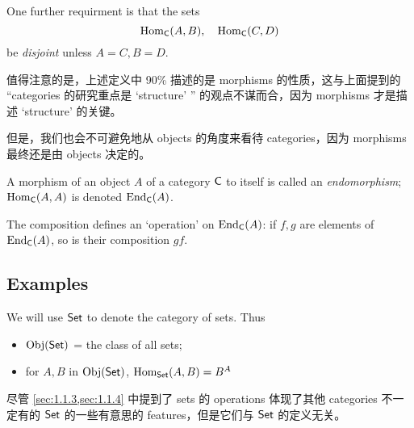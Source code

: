One further requirment is that the sets
\[
    \operatorname{Hom}_{\operatorname{\mathsf{C}}}(A, B), \quad \operatorname{Hom}_{\operatorname{\mathsf{C}}}(C, D)
\]
be \emph{disjoint} unless \(A = C, B = D\).

\begin{note}
    值得注意的是，上述定义中 90\% 描述的是 morphisms 的性质，这与上面提到的 ``categories 的研究重点是 `structure' '' 的观点不谋而合，因为 morphisms 才是描述 `structure' 的关键。

    但是，我们也会不可避免地从 objects 的角度来看待 categories，因为 morphisms 最终还是由 objects 决定的。
\end{note}

\begin{definition}[Endomorphism]\label{def:endomorphism}
    A morphism of an object \(A\) of a category \(\operatorname{\mathsf{C}}\) to itself is called an \emph{endomorphism}; \(\operatorname{Hom}_{\operatorname{\mathsf{C}}}(A, A)\) is denoted \(\operatorname{End}_{\operatorname{\mathsf{C}}}(A)\).
    \begin{note}
        The composition defines an `operation' on \(\operatorname{End}_{\operatorname{\mathsf{C}}}(A)\): if \(f, g\) are elements of \(\operatorname{End}_{\operatorname{\mathsf{C}}}(A)\), so is their composition \(gf\).
    \end{note}
\end{definition}

\subsection{Examples}\label{sec:1.3.2}

\begin{eg}[Set]\label{eg:1.3.2}
    We will use \(\operatorname{\mathsf{Set}}\) to denote the category of sets. Thus
    \begin{itemize}
        \item \(\operatorname{Obj}(\operatorname{\mathsf{Set}})\) = the class of all sets;
        \item for \(A, B\) in \(\operatorname{Obj}(\operatorname{\mathsf{Set}})\), \(\operatorname{Hom}_{\operatorname{\mathsf{Set}}}(A, B) = B^A\)
    \end{itemize}

    \begin{note}
        尽管 \cref{sec:1.1.3,sec:1.1.4} 中提到了 sets 的 operations 体现了其他 categories 不一定有的 \(\operatorname{\mathsf{Set}}\) 的一些有意思的 features，但是它们与 \(\operatorname{\mathsf{Set}}\) 的定义无关。
    \end{note}
\end{eg}

